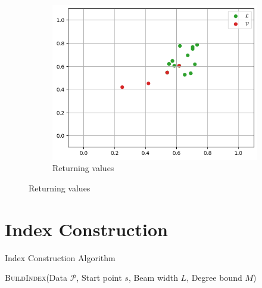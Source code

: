 \begin{figure}[h]
\begin{subfigure}{0.31\textwidth}
            \includegraphics[width=\textwidth]{images/greedy-search-final}
            \caption{Returning values}
        \end{subfigure}
        \hfill
    \end{figure}


\section{Index Construction}

{Index Construction Algorithm}
    \begin{algorithm}[H]
        \caption{\textsc{BuildIndex}(Data \(\mathcal{P}\), Start point \(s\), Beam width \(L\), Degree bound \(M\))}
        \begin{algorithmic}[1]
                 
                 
            \EndFor
        \end{algorithmic}
    \end{algorithm}


